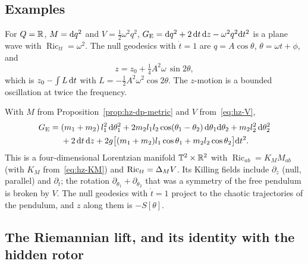 \subsection{Examples}

\begin{example}\label{ex:hz-eis-ho}
For $Q=\mathbb{R}$, $M=\mathrm{d} q^2$ and $V=\tfrac12\omega^2q^2$,
$G_{\rm E}=\mathrm{d} q^2+2\,\mathrm{d} t\,\mathrm{d} z-\omega^2q^2\mathrm{d} t^2$ is a plane wave with $\operatorname{Ric}_{tt}=\omega^2$.
The null geodesics with $\dot t=1$ are $q=A\cos\theta$, $\theta=\omega t+\phi$, and
\[
  z=z_0+\tfrac14A^2\omega\,\sin2\theta ,
\]
which is $z_0-\int L\,\mathrm{d} t$ with $L=-\tfrac12A^2\omega^2\cos2\theta$. The $z$-motion is a
bounded oscillation at twice the frequency.
\end{example}

\begin{example}\label{ex:hz-eis-dp}
With $M$ from Proposition~\ref{prop:hz-dp-metric} and $V$ from~\eqref{eq:hz-V},
\[
\begin{aligned}
  G_{\rm E}={}&(m_1+m_2)\,l_1^2\,\mathrm{d}\theta_1^2+2m_2l_1l_2\cos(\theta_1-\theta_2)\,\mathrm{d}\theta_1\mathrm{d}\theta_2
  +m_2l_2^2\,\mathrm{d}\theta_2^2\\
  &+2\,\mathrm{d} t\,\mathrm{d} z+2g\bigl[(m_1+m_2)l_1\cos\theta_1+m_2l_2\cos\theta_2\bigr]\mathrm{d} t^2 .
\end{aligned}
\]
This is a four-dimensional Lorentzian manifold $\mathbb{T}^2\times\mathbb{R}^2$ with
$\operatorname{Ric}_{ab}=K_MM_{ab}$ (with $K_M$ from~\eqref{eq:hz-KM}) and $\operatorname{Ric}_{tt}=\Delta_MV$.
Its Killing fields include $\partial_z$ (null, parallel) and $\partial_t$; the rotation
$\partial_{\theta_1}+\partial_{\theta_2}$ that was a symmetry of the free pendulum is
broken by $V$. The null geodesics with $\dot t=1$ project to the chaotic trajectories of the pendulum,
and $z$ along them is $-S[\theta]$.
\end{example}

\subsection{The Riemannian lift, and its identity with the hidden rotor}

